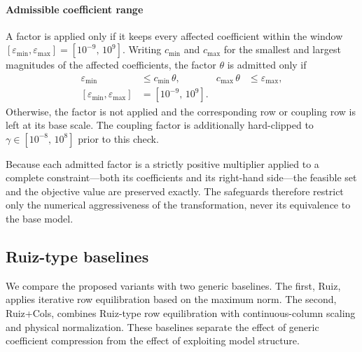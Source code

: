 \documentclass[AMA,Times1COL]{WileyNJDv5} %
\newcommand{\methodRuiz}{Ruiz}
\newcommand{\methodRuizCols}{Ruiz+Cols}
\begin{document}
\paragraph{Admissible coefficient range}
A factor is applied only if it keeps every affected coefficient within the window
$[\varepsilon_{\min},\varepsilon_{\max}] = [10^{-9},\,10^{9}]$. Writing
$c_{\min}$ and $c_{\max}$ for the smallest and largest magnitudes of the affected
coefficients, the factor $\theta$ is admitted only if
\begin{equation}
\begin{aligned}
\varepsilon_{\min} &\le c_{\min}\,\theta,
& c_{\max}\,\theta &\le \varepsilon_{\max},\\
[\varepsilon_{\min},\varepsilon_{\max}]&=[10^{-9},\,10^{9}].
\end{aligned}
\label{eq:coef-window}
\end{equation}
Otherwise, the factor is not applied and the corresponding row or coupling row is left at its base scale. The coupling factor is additionally hard-clipped to
$\gamma \in [10^{-8},\,10^{8}]$ prior to this check.

Because each admitted factor is a strictly positive multiplier applied to a complete
constraint---both its coefficients and its right-hand side---the feasible set and the
objective value are preserved exactly. The safeguards therefore restrict only the
numerical aggressiveness of the transformation, never its equivalence to the base model.


\subsection{Ruiz-type baselines}

We compare the proposed variants with two generic baselines. The first,
\methodRuiz{}, applies iterative row equilibration based on the maximum norm. The
second, \methodRuizCols{}, combines Ruiz-type row equilibration with continuous-column
scaling and physical normalization. These baselines separate the effect of generic
coefficient compression from the effect of exploiting model structure.
\end{document}
